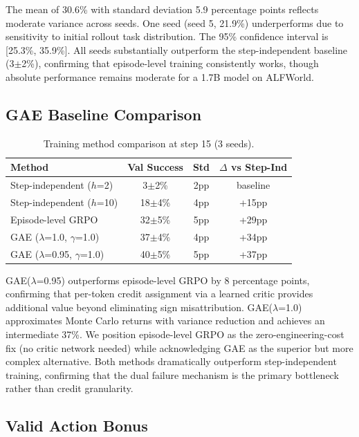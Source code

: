 \documentclass[11pt]{article}
\begin{document}
The mean of 30.6\% with standard deviation 5.9 percentage points reflects moderate variance across seeds. One seed (seed 5, 21.9\%) underperforms due to sensitivity to initial rollout task distribution. The 95\% confidence interval is [25.3\%, 35.9\%]. All seeds substantially outperform the step-independent baseline (3$\pm$2\%), confirming that episode-level training consistently works, though absolute performance remains moderate for a 1.7B model on ALFWorld.

\subsection{GAE Baseline Comparison}

\begin{table}[h]
\centering
\caption{Training method comparison at step 15 (3 seeds).}
\label{tab:gae}
\begin{tabular}{lccc}
\toprule
Method & Val Success & Std & $\Delta$ vs Step-Ind \\
\midrule
Step-independent ($h$=2) & 3$\pm$2\% & 2pp & baseline \\
Step-independent ($h$=10) & 18$\pm$4\% & 4pp & +15pp \\
Episode-level GRPO & 32$\pm$5\% & 5pp & +29pp \\
GAE ($\lambda$=1.0, $\gamma$=1.0) & 37$\pm$4\% & 4pp & +34pp \\
GAE ($\lambda$=0.95, $\gamma$=1.0) & 40$\pm$5\% & 5pp & +37pp \\
\bottomrule
\end{tabular}
\end{table}

GAE($\lambda$=0.95) outperforms episode-level GRPO by 8 percentage points, confirming that per-token credit assignment via a learned critic provides additional value beyond eliminating sign misattribution. GAE($\lambda$=1.0) approximates Monte Carlo returns with variance reduction and achieves an intermediate 37\%. We position episode-level GRPO as the zero-engineering-cost fix (no critic network needed) while acknowledging GAE as the superior but more complex alternative. Both methods dramatically outperform step-independent training, confirming that the dual failure mechanism is the primary bottleneck rather than credit granularity.

\subsection{Valid Action Bonus}
\end{document}
